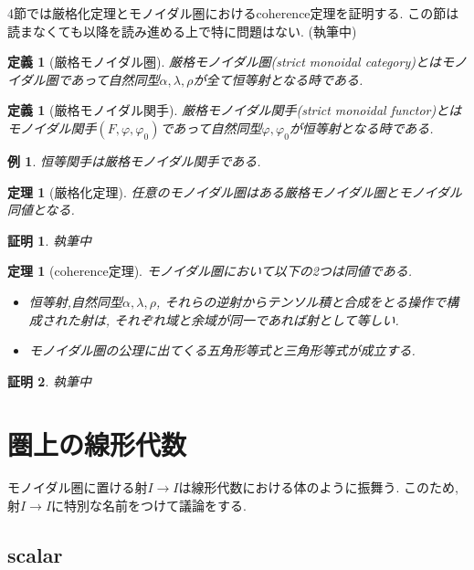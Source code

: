 \documentclass[a4paper,12pt]{ltjsarticle}
\theoremstyle{break}
\newtheorem{defn}[thm]{定義}
\newtheorem{thrm}[thm]{定理}
\newtheorem{eg}[thm]{例}
\newtheorem*{prf}{証明}
\newcommand{\al}{\alpha}
\newcommand{\la}{\lambda}
\newcommand{\vp}{\varphi}
\numberwithin{equation}{section}
\begin{document}
4節では厳格化定理とモノイダル圏におけるcoherence定理を証明する. 
この節は読まなくても以降を読み進める上で特に問題はない. 
(執筆中)

\begin{defn}[厳格モノイダル圏]
  厳格モノイダル圏(strict monoidal category)とはモノイダル圏であって自然同型$\al,\la,\rho$が全て恒等射となる時である. 
\end{defn}

\begin{defn}[厳格モノイダル関手]
  厳格モノイダル関手(strict monoidal functor)とはモノイダル関手$(F,\vp,\vp_0)$であって自然同型$\vp,\vp_0$が恒等射となる時である. 
\end{defn}

\begin{eg}
  恒等関手は厳格モノイダル関手である. 
\end{eg}

\begin{thrm}[厳格化定理]
  任意のモノイダル圏はある厳格モノイダル圏とモノイダル同値となる.  
\end{thrm} 

\begin{prf}
  執筆中
\end{prf}

\begin{thrm}[coherence定理]
  モノイダル圏において以下の2つは同値である. 
  \begin{itemize}
    \item 恒等射,自然同型$\al,\la,\rho$, それらの逆射からテンソル積と合成をとる操作で構成された射は, それぞれ域と余域が同一であれば射として等しい. 
    \item モノイダル圏の公理に出てくる五角形等式と三角形等式が成立する. 
  \end{itemize}
\end{thrm}

\begin{prf}
  執筆中
\end{prf}

\newpage

\section{圏上の線形代数}

モノイダル圏に置ける射$I \to I$は線形代数における体のように振舞う. 
このため, 射$I \to I$に特別な名前をつけて議論をする. 

\subsection{scalar}
\end{document}
